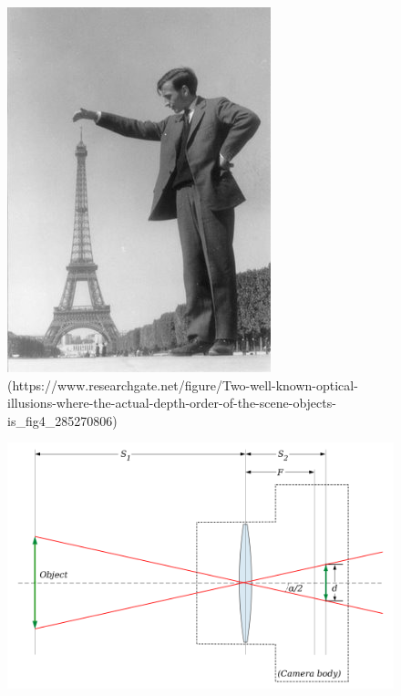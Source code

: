 \begin{figure} [H]
	\centering
		\begin{minipage}{.4\textwidth}
			\centering
			\captionsetup{width=.9\linewidth}
			\includegraphics[width=0.8\linewidth]{Images/Theoretical-Background/Two-well-known-optical-illusions-where-the-actual-depth-order-of-the-scene-objects-is.jpg}\\
			\decoRule
			(https://www.researchgate.net/figure/Two-well-known-optical-illusions-where-the-actual-depth-order-of-the-scene-objects-is_fig4_285270806)
			\label{fig:depth-ambiguity-optical-illusion}
		\end{minipage}%
		\begin{minipage}{.6\textwidth}
			\centering
			\includegraphics[width=\linewidth]{Images/Theoretical-Background/Lens_angle_of_view.png}\\

\end{minipage}
\end{figure}
